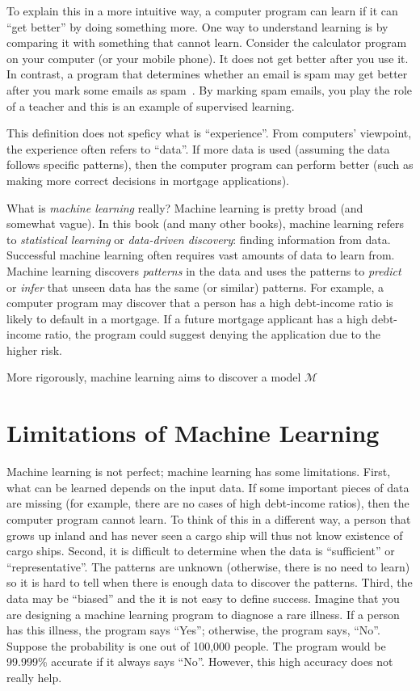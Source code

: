   

  To explain this in a more intuitive way, a computer program can
  learn if it can ``get better'' by doing something more.  One way to
  understand learning is by comparing it with something that cannot
  learn. Consider the calculator program on your computer (or your
  mobile phone). It does not get better after you use it.  In
  contrast, a program that determines whether an email is spam may get
  better after you mark some emails as
  spam~\cite{Hastie2009ElementsStatisticalLearning}.  By marking spam
  emails, you play the role of a teacher and this is an example of
  supervised learning.




This definition does not speficy what is ``experience''.  From
computers' viewpoint, the experience often refers to ``data''.  If
more data is used (assuming the data follows specific patterns), then
the computer program can perform better (such as making more correct
decisions in mortgage applications).

What is {\it machine learning} really?  Machine learning is pretty
broad (and somewhat vague).  In this book (and many other books),
machine learning refers to {\it statistical learning} or {\it
  data-driven discovery}: finding information from data.  Successful
machine learning often requires vast amounts of data to learn from.
Machine learning discovers {\it patterns} in the data and uses the
patterns to {\it predict} or {\it infer} that unseen data has the same
(or similar) patterns.  For example, a computer program may discover
that a person has a high debt-income ratio is likely to default in a
mortgage.  If a future mortgage applicant has a high debt-income
ratio, the program could suggest denying the application due to the
higher risk.

More rigorously, machine learning aims to discover
a model $\mathcal{M}$ 

\section{Limitations of Machine Learning}

Machine learning is not perfect; machine learning has some
limitations.  First, what can be learned depends on the input data. If
some important pieces of data are missing (for example, there are no
cases of high debt-income ratios), then the computer program cannot
learn.  To think of this in a different way, a person that grows up
inland and has never seen a cargo ship will thus not know existence of
cargo ships.  Second, it is difficult to determine when the data is
``sufficient'' or ``representative''.  The patterns are unknown
(otherwise, there is no need to learn) so it is hard to tell when
there is enough data to discover the patterns.  Third, the data may be
``biased'' and the it is not easy to define success. Imagine that you
are designing a machine learning program to diagnose a rare illness.
If a person has this illness, the program says ``Yes''; otherwise, the
program says, ``No''.  Suppose the probability is one out of 100,000
people.  The program would be 99.999\% accurate if it always says
``No''.  However, this high accuracy does not really help.

